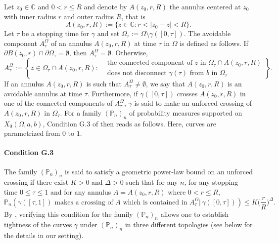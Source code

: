 \documentclass{article}
\newcommand{\PP}{{\mathbb{P}}}
\theoremstyle{definition}
\theoremstyle{remark}
\theoremstyle{remark}
\begin{document}
Let $z_0 \in \mathbb{C}$ and $0 < r \leq R$ and denote by $A(z_0, r, R)$ the annulus centered at $z_0$ with inner radius $r$ and outer radius $R$, that is
\begin{equation*}
    A(z_0,r,R) := \{ z \in \mathbb{C}: r < \vert z_0-z \vert < R \}.
\end{equation*}
Let $\tau$ be a stopping time for $\gamma$ and set $\Omega_{\tau}:= \Omega \setminus \gamma([0,\tau])$. The avoidable component $A_{\tau}^{\Omega}$ of an annulus $A(z_0,r,R)$ at time $\tau$ in $\Omega$ is defined as follows. If $\partial B(z_0,r) \cap \partial \Omega_{\tau} = \emptyset$, then $A_{\tau}^{\Omega} = \emptyset$. Otherwise,
\begin{equation*}
    A_{\tau}^{\Omega} := \left \{ z \in \Omega_{\tau} \cap A(z_0,r,R): 
    \begin{aligned}
    &\text{the connected component of $z$ in $\Omega_{\tau} \cap A(z_0,r,R)$} \\ 
    &\text{does not disconnect $\gamma(\tau)$ from $b$ in $\Omega_{\tau}$}
    \end{aligned}
    \right \}.
\end{equation*}
If an annulus $A(z_0,r,R)$ is such that $A^{\Omega}_{\tau} \neq \emptyset$, we say that $A(z_0,r,R)$ is an avoidable annulus at time $\tau$. Furthermore, if $\gamma([0,\tau])$ crosses $A(z_0,r,R)$ in one of the connected components of $A_{\tau}^{\Omega}$, $\gamma$ is said to make an unforced crossing of $A(z_0,r,R)$ in $\Omega_{\tau}$. For a family $(\PP_{n})_{n}$ of probability measures supported on $X_0(\Omega,a,b)$, Condition G.3 of \cite{Smirnov} then reads as follows. Here, curves are parametrized from $0$ to $1$.

\paragraph{Condition G.3}\label{condG3} The family $(\PP_{n})_{n}$ is said to satisfy a geometric power-law bound on an unforced crossing if there exist $K > 0$ and $\Delta > 0$ such that for any $n$, for any stopping time $0 \leq \tau \leq 1$ and for any annulus $A = A(z_0, r, R)$ where $0 < r \leq R$,
\begin{equation*}
    \PP_{n}(\gamma([\tau,1]) \text{ makes a crossing of $A$ which is contained in $A_{\tau}^{\Omega}$} \vert \, \gamma([0,\tau])) \leq K\bigg(\frac{r}{R}\bigg)^{\Delta}.
\end{equation*}
By \cite[Theorem~1.7]{Smirnov}, verifying this condition for the family $(\PP_n)_n$ allows one to establish tightness of the curves $\gamma$ under $(\PP_n)_n$ in three different topologies (see below for the details in our setting).
\end{document}
